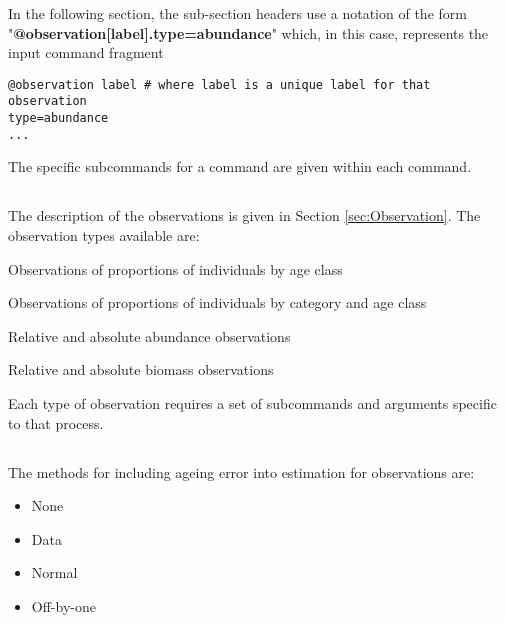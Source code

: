 In the following section, the sub-section headers use a notation of the form "\textbf {@observation[label].type=abundance}" which, in this case, represents the input command fragment
{\small{\begin{verbatim}
@observation label # where label is a unique label for that observation
type=abundance
...
\end{verbatim}}}
The specific subcommands for a command are given within each command.

\subsection{}\label{syntax:ObservationTypes}

The description of the observations is given in Section \ref{sec:Observation}. The observation types available are:

\begin{description}
  \item Observations of proportions of individuals by age class
  \item Observations of proportions of individuals by category and age class
  \item Relative and absolute abundance observations
  \item Relative and absolute biomass observations
\end{description}

Each type of observation requires a set of subcommands and arguments specific to that process.

\ifAgeBased

\else

\fi 

\subsection{}


\ifAgeBased
\subsection{}\label{syntax:AgeingError}

The methods for including ageing error into estimation for observations are:

\begin{itemize}
	\item None
	\item Data
	\item Normal
	\item Off-by-one
\end{itemize}

